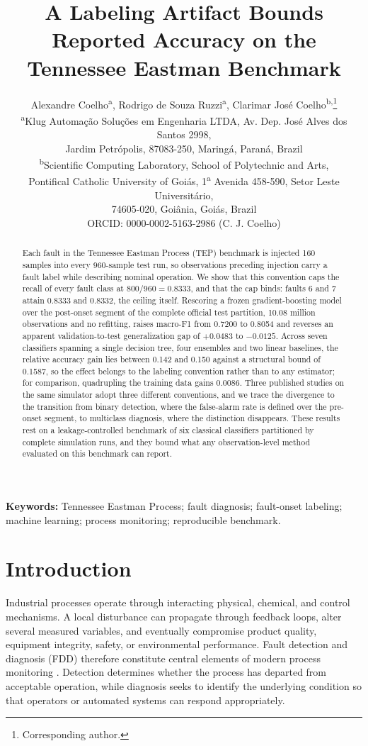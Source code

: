 \documentclass[10pt,twocolumn,a4paper]{article}
\title{\Large\textbf{A Labeling Artifact Bounds Reported Accuracy on the\\
Tennessee Eastman Benchmark}}
\author{
Alexandre Coelho\textsuperscript{a},\;
Rodrigo de Souza Ruzzi\textsuperscript{a},\;
Clarimar Jos\'e Coelho\textsuperscript{b,}\thanks{Corresponding author.}\\[4pt]
\small \textsuperscript{a}Klug Automa\c{c}\~ao Solu\c{c}\~oes em Engenharia LTDA,
Av. Dep. Jos\'e Alves dos Santos 2998,\\
\small Jardim Petr\'opolis, 87083-250, Maring\'a, Paran\'a, Brazil\\[2pt]
\small \textsuperscript{b}Scientific Computing Laboratory, School of Polytechnic
and Arts,\\
\small Pontifical Catholic University of Goi\'as, 1\textsuperscript{a} Avenida
458-590, Setor Leste Universit\'ario,\\
\small 74605-020, Goi\^ania, Goi\'as, Brazil\\[2pt]
\small ORCID: 0000-0002-5163-2986 (C. J. Coelho)}
\date{}
\begin{document}
\maketitle

\begin{abstract}
Each fault in the Tennessee Eastman Process (TEP) benchmark is injected 160
samples into every 960-sample test run, so observations preceding injection
carry a fault label while describing nominal operation. We show that this
convention caps the recall of every fault class at $800/960=0.8333$, and that
the cap binds: faults 6 and 7 attain 0.8333 and 0.8332, the ceiling itself.
Rescoring a frozen gradient-boosting model over the post-onset segment of the
complete official test partition, 10.08 million observations and no refitting,
raises macro-F1 from 0.7200 to 0.8054 and reverses an apparent
validation-to-test generalization gap of $+0.0483$ to $-0.0125$. Across seven
classifiers spanning a single decision tree, four ensembles and two linear
baselines, the relative accuracy gain lies between 0.142 and 0.150 against a
structural bound of 0.1587, so the effect belongs to the labeling convention
rather than to any estimator; for comparison, quadrupling the training data
gains 0.0086. Three published studies on the same simulator adopt three
different conventions, and we trace the divergence to the transition from
binary detection, where the false-alarm rate is defined over the pre-onset
segment, to multiclass diagnosis, where the distinction disappears. These
results rest on a leakage-controlled benchmark of six classical classifiers
partitioned by complete simulation runs, and they bound what any
observation-level method evaluated on this benchmark can report.
\end{abstract}

\noindent\textbf{Keywords:} Tennessee Eastman Process; fault diagnosis;
fault-onset labeling; machine learning; process monitoring; reproducible
benchmark.

\section{Introduction}

Industrial processes operate through interacting physical, chemical, and
control mechanisms. A local disturbance can propagate through feedback loops,
alter several measured variables, and eventually compromise product quality,
equipment integrity, safety, or environmental performance. Fault detection and
diagnosis (FDD) therefore constitute central elements of modern process
monitoring \cite{venkatasubramanian2003review,yin2014review,ji2022review}.
Detection determines whether the process has departed from acceptable
operation, while diagnosis seeks to identify the underlying condition so that
operators or automated systems can respond appropriately.
\end{document}
